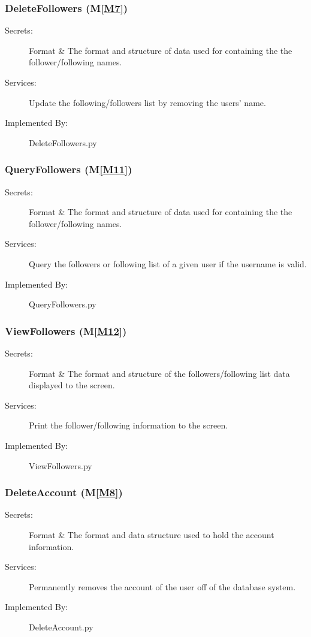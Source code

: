 \documentclass[12pt, titlepage]{article}
\newcommand{\mref}[1]{M\ref{#1}}
\begin{document}
\subsubsection{DeleteFollowers (\mref{M7})}
\begin{description}
\item[Secrets:]Format \& The format and structure of data used for containing the the follower/following names.
\item[Services:] Update the following/followers list by removing the users' name.
\item[Implemented By:] DeleteFollowers.py
\end{description}

\subsubsection{QueryFollowers (\mref{M11})}
\begin{description}
\item[Secrets:]Format \& The format and structure of data used for containing the the follower/following names.
\item[Services:] Query the followers or following list of a given user if the username is valid.
\item[Implemented By:] QueryFollowers.py
\end{description}

\subsubsection{ViewFollowers (\mref{M12})}
\begin{description}
\item[Secrets:]Format \& The format and structure of the followers/following list data displayed to the screen.
\item[Services:] Print the follower/following information to the screen.
\item[Implemented By:] ViewFollowers.py
\end{description}

\subsubsection{DeleteAccount (\mref{M8})}
\begin{description}
\item[Secrets:]Format \& The format and data structure used to hold the account information.
\item[Services:] Permanently removes the account of the user off of the database system.
\item[Implemented By:] DeleteAccount.py
\end{description}
\end{document}
